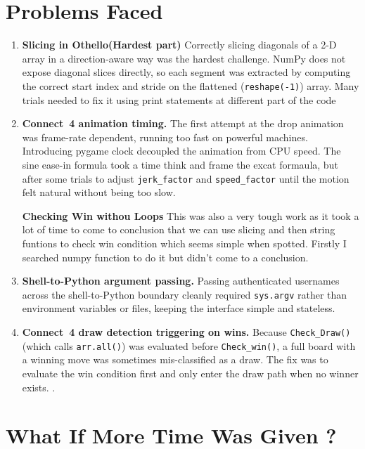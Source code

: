 \documentclass[12pt]{article}
\begin{document}
\section{Problems Faced}
 
\begin{enumerate}
    \item \textbf{Slicing in Othello(Hardest part)}
    Correctly slicing diagonals of a 2-D array in a direction-aware way was the hardest challenge. NumPy does not expose diagonal slices directly, so each segment was extracted by computing the correct start index and stride on the flattened (\texttt{reshape(-1)}) array. Many trials needed to fix it using print statements at different part of the code
 
    \item \textbf{Connect~4 animation timing.}
    The first attempt at the drop animation was frame-rate dependent, running too fast on powerful machines. Introducing pygame clock decoupled the animation from CPU speed. The sine ease-in formula took a time think and frame the excat formaula, but after some trials to adjust \texttt{jerk\_factor} and \texttt{speed\_factor} until the motion felt natural without being too slow.
 
    \textbf{Checking Win withou Loops}
    This was also a very tough work as it took a lot of time to come to conclusion that we can use slicing and then string funtions to check win condition which seems simple when spotted. Firstly I searched numpy function to do it but didn't come to a conclusion.
 
    \item \textbf{Shell-to-Python argument passing.}
    Passing authenticated usernames across the shell-to-Python boundary cleanly required \texttt{sys.argv} rather than environment variables or files, keeping the interface simple and stateless.
 
    \item \textbf{Connect~4 draw detection triggering on wins.}
    Because \texttt{Check\_Draw()} (which calls \texttt{arr.all()}) was evaluated before \texttt{Check\_win()}, a full board with a winning move was sometimes mis-classified as a draw. The fix was to evaluate the win condition first and only enter the draw path when no winner exists.
.
\end{enumerate}
 
\section{What If More Time Was Given ?}
 
\end{document}
